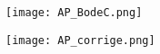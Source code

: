 \ifprof
\begin{corrige}
\begin{center}
\texttt{[image: AP\_BodeC.png]}

\texttt{[image: AP\_corrige.png]}
\end{center}
\end{corrige}
\fi

\ifprof
\else
%

\fi


%